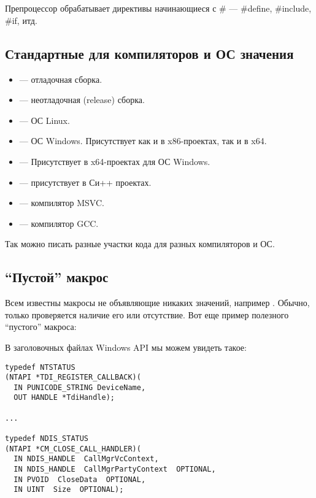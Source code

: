 ﻿\chapter{}

Препроцессор обрабатывает директивы начинающиеся с \# --- \#define, \#include, \#if, итд.

\section{Стандартные для компиляторов и ОС значения}

\begin{itemize}
\item {} --- отладочная сборка.
\item {} --- неотладочная (release) сборка.
\item {} --- ОС Linux.
\item {} --- ОС Windows. Присутствует как и в x86-проектах, так и в x64.
\item {} --- Присутствует в x64-проектах для ОС Windows.
\item {} --- присутствует в Си++ проектах.
\item {} --- компилятор MSVC.
\item {} --- компилятор GCC.
\end{itemize}

Так можно писать разные участки кода для разных компиляторов и ОС.

\section{``Пустой'' макрос}

Всем известны макросы не объявляющие никаких значений, например .
Обычно, только проверяется наличие его или отсутствие.
Вот еще пример полезного ``пустого'' макроса:

В заголовочных файлах Windows API мы можем увидеть такое:

\begin{lstlisting}
typedef NTSTATUS
(NTAPI *TDI_REGISTER_CALLBACK)(
  IN PUNICODE_STRING DeviceName,
  OUT HANDLE *TdiHandle);

...

typedef NDIS_STATUS
(NTAPI *CM_CLOSE_CALL_HANDLER)(
  IN NDIS_HANDLE  CallMgrVcContext,
  IN NDIS_HANDLE  CallMgrPartyContext  OPTIONAL,
  IN PVOID  CloseData  OPTIONAL,
  IN UINT  Size  OPTIONAL);
\end{lstlisting}


